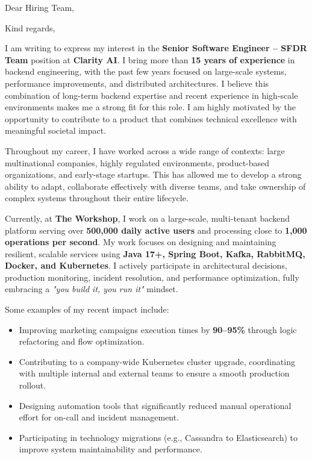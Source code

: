 \documentclass[11pt,a4paper,sans]{moderncv}
\begin{document}
\date{December 16th, 2025}
\subject{Senior Software Engineer - SFDR Team}
\opening{Dear Hiring Team,}
\closing{Kind regards,}

\makelettertitle

\begin{justify}
I am writing to express my interest in the \textbf{Senior Software Engineer – SFDR Team} position at \textbf{Clarity AI}. I bring more than \textbf{15 years of experience} in backend engineering, with the past few years focused on large-scale systems, performance improvements, and distributed architectures. I believe this combination of long-term backend expertise and recent experience in high-scale environments makes me a strong fit for this role. I am highly motivated by the opportunity to contribute to a product that combines technical excellence with meaningful societal impact.

Throughout my career, I have worked across a wide range of contexts: large multinational companies, highly regulated environments, product-based organizations, and early-stage startups. This has allowed me to develop a strong ability to adapt, collaborate effectively with diverse teams, and take ownership of complex systems throughout their entire lifecycle.

Currently, at \textbf{The Workshop}, I work on a large-scale, multi-tenant backend platform serving over \textbf{500,000 daily active users} and processing close to \textbf{1,000 operations per second}. My work focuses on designing and maintaining resilient, scalable services using \textbf{Java 17+, Spring Boot, Kafka, RabbitMQ, Docker, and Kubernetes}. I actively participate in architectural decisions, production monitoring, incident resolution, and performance optimization, fully embracing a \textit{"you build it, you run it"} mindset.

Some examples of my recent impact include:
\begin{itemize}
  \item Improving marketing campaigns execution times by \textbf{90--95\%} through logic refactoring and flow optimization.
  \item Contributing to a company-wide Kubernetes cluster upgrade, coordinating with multiple internal and external teams to ensure a smooth production rollout.
  \item Designing automation tools that significantly reduced manual operational effort for on-call and incident management.
  \item Participating in technology migrations (e.g., Cassandra to Elasticsearch) to improve system maintainability and performance.
\end{itemize}


\end{justify}
\end{document}

